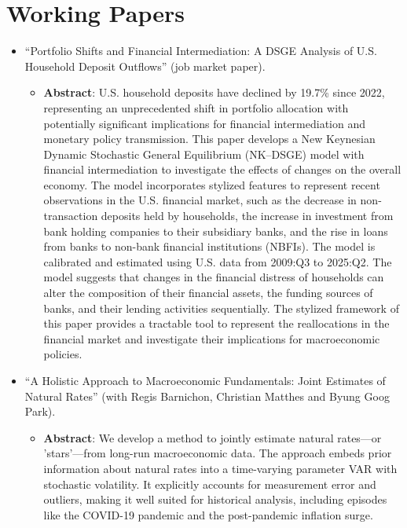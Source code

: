 \documentclass[11pt,a4paper]{article}
\begin{document}
\vspace{5mm}

\section*{Working Papers} 
\begin{itemize}[leftmargin=*]
    \item ``Portfolio Shifts and Financial Intermediation: A DSGE Analysis of U.S. Household Deposit Outflows'' (job market paper).
    \begin{itemize}
        \item \textbf{Abstract}: U.S. household deposits have declined by 19.7\% since 2022, representing an unprecedented shift in portfolio allocation with potentially significant implications for financial intermediation and monetary policy transmission. This paper develops a New Keynesian Dynamic Stochastic General Equilibrium (NK--DSGE) model with financial intermediation to investigate the effects of changes on the overall economy. The model incorporates stylized features to represent recent observations in the U.S. financial market, such as the decrease in non-transaction deposits held by households, the increase in investment from bank holding companies to their subsidiary banks, and the rise in loans from banks to non-bank financial institutions (NBFIs). The model is calibrated and estimated using U.S. data from 2009:Q3 to 2025:Q2. The model suggests that changes in the financial distress of households can alter the composition of their financial assets, the funding sources of banks, and their lending activities sequentially. The stylized framework of this paper provides a tractable tool to represent the reallocations in the financial market and investigate their implications for macroeconomic policies.
    \end{itemize}        
    \item ``A Holistic Approach to Macroeconomic Fundamentals: Joint Estimates of Natural Rates'' (with Regis Barnichon, Christian Matthes and Byung Goog Park).    
    \begin{itemize}
        \item \textbf{Abstract}: We develop a method to jointly estimate natural rates—or 'stars'—from long-run macroeconomic data. The approach embeds prior information about natural rates into a time-varying parameter VAR with stochastic volatility. It explicitly accounts for measurement error and outliers, making it well suited for historical analysis, including episodes like the COVID-19 pandemic and the post-pandemic inflation surge.
    \end{itemize}
\end{itemize}
\vspace{3mm}
\end{document}

